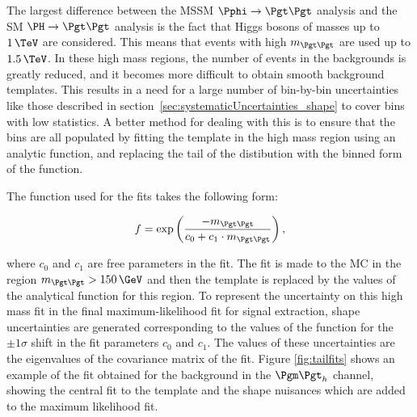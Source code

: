 The largest difference between the \ac{MSSM} $\Pphi\to\Pgt\Pgt$ analysis and the
\ac{SM} $\HToTauTau$ analysis is the fact that Higgs bosons of
masses up to $1\,\TeV$ are considered. This means that events with high $m_{\Pgt\Pgt}$
are used up to $1.5\,\TeV$. In these high mass regions, the
number of events in the backgrounds is greatly reduced, and it becomes more
difficult to obtain smooth background templates. This results in a need for a
large number of bin-by-bin uncertainties like those described in
section~\ref{sec:systematicUncertainties_shape} to cover bins with low
statistics. A better method for dealing with this is to ensure that the bins are
all populated by fitting the template in the high mass region using an analytic
function, and replacing the tail of the distibution with the binned form of the function.

The function used for the fits takes the following form:

\begin{equation}
f = \exp\left(\frac{-m_{\Pgt\Pgt}}{c_{0} + c_{1}\cdot m_{\Pgt\Pgt}}\right) ,
\end{equation}

where $c_{0}$ and $c_{1}$ are free parameters in the fit. The fit is made to
the \ac{MC} in the region $m_{\Pgt\Pgt} > 150\,\GeV$ and then the template is
replaced by the values of the analytical function for this region. To represent
the uncertainty on this high mass fit in the final maximum-likelihood fit for
signal extraction, shape uncertainties are generated corresponding to the 
values of the function for the $\pm1\sigma$ shift in the fit parameters $c_{0}$ 
and $c_{1}$. The values of these uncertainties are the 
eigenvalues of the covariance matrix of the fit. Figure \ref{fig:tailfits} shows
an example of the fit obtained for the \WJets background in the $\mutau$
channel, showing the central fit to the template and the shape nuisances which
are added to the maximum likelihood fit.

